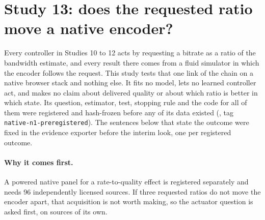\section{Study 13: does the requested ratio move a native encoder?}
\label{sec:native-n1}
Every controller in Studies 10 to 12 acts by requesting a bitrate as a ratio of the bandwidth estimate, and every result there comes from a fluid simulator in which the encoder follows the request. This study tests that one link of the chain on a native browser stack and nothing else. It fits no model, lets no learned controller act, and makes no claim about delivered quality or about which ratio is better in which state. Its question, estimator, test, stopping rule and the code for all of them were registered and hash-frozen before any of its data existed (, tag \texttt{native-n1-preregistered}). The sentences below that state the outcome were fixed in the evidence exporter before the interim look, one per registered outcome.

\paragraph{Why it comes first.}
A powered native panel for a rate-to-quality effect is registered separately and needs 96 independently licensed sources. If three requested ratios do not move the encoder apart, that acquisition is not worth making, so the actuator question is asked first, on sources of its own.

